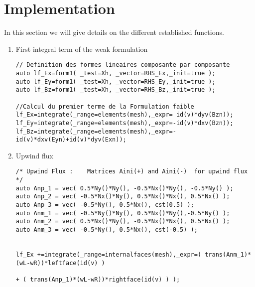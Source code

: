 \documentclass[a4paper,oneside,10pt]{report}
\begin{document}
\section{Implementation}

In this section we will give details on the different established functions.  

\begin{enumerate}
\item First integral term of the weak formulation
\begin{center}
\begin{minipage}{\textwidth}
\begin{lstlisting}[label=code2,caption=Terme integral 1]
// Definition des formes lineaires composante par composante
auto lf_Ex=form1( _test=Xh, _vector=RHS_Ex,_init=true );
auto lf_Ey=form1( _test=Xh, _vector=RHS_Ey,_init=true );
auto lf_Bz=form1( _test=Xh, _vector=RHS_Bz,_init=true );

//Calcul du premier terme de la Formulation faible
lf_Ex=integrate(_range=elements(mesh),_expr= id(v)*dyv(Bzn));
lf_Ey=integrate(_range=elements(mesh),_expr=-id(v)*dxv(Bzn));
lf_Bz=integrate(_range=elements(mesh),_expr=-id(v)*dxv(Eyn)+id(v)*dyv(Exn));
\end{lstlisting}
\end{minipage}
\end{center}


\item Upwind flux

\begin{center}
\begin{minipage}{\textwidth}
\begin{lstlisting}[label=code2,caption=Upwind flux]
/* Upwind Flux : 	Matrices Aini(+) and Aini(-)  for upwind flux 	*/
auto Anp_1 = vec( 0.5*Ny()*Ny(), -0.5*Nx()*Ny(), -0.5*Ny() );
auto Anp_2 = vec( -0.5*Nx()*Ny(), 0.5*Nx()*Nx(), 0.5*Nx() );
auto Anp_3 = vec( -0.5*Ny(), 0.5*Nx(), cst(0.5) );
auto Anm_1 = vec( -0.5*Ny()*Ny(), 0.5*Nx()*Ny(),-0.5*Ny() );
auto Anm_2 = vec( 0.5*Nx()*Ny(), -0.5*Nx()*Nx(), 0.5*Nx() );
auto Anm_3 = vec( -0.5*Ny(), 0.5*Nx(), cst(-0.5) );
	

lf_Ex +=integrate(_range=internalfaces(mesh),_expr=( trans(Anm_1)*(wL-wR))*leftface(id(v) )
																		   + ( trans(Anp_1)*(wL-wR))*rightface(id(v) ) );


\end{lstlisting}
\end{minipage}
\end{center}
\end{enumerate}
\end{document}
